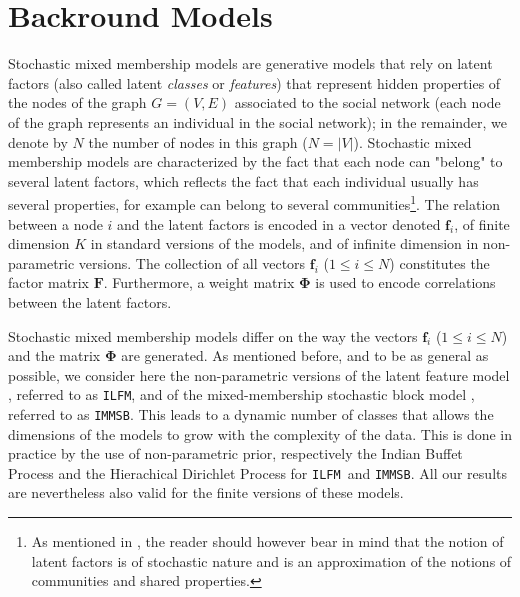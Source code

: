 \documentclass[journal]{IEEEtran}
\newcommand{\ifm}{\texttt{ILFM}}
\newcommand{\imb}{\texttt{IMMSB}}
\newcommand{\mat}[1]{\mathbf{#1}}
\begin{document}
\section{Backround Models}
\label{sec:background}

Stochastic mixed membership models are generative models that rely on latent factors (also called latent \textit{classes} or \textit{features}) that represent hidden properties of the nodes of the graph $G=(V,E)$ associated to the social network (each node of the graph represents an individual in the social network); in the remainder, we denote by $N$ the number of nodes in this graph ($N=|V|$). Stochastic mixed membership models are characterized by the fact that each node can "belong" to several latent factors, which reflects the fact that each individual usually has several properties, for example can belong to several communities\footnote{As mentioned in \cite{goldenberg2010survey}, the reader should however bear in mind that the notion of latent factors is of stochastic nature and is an approximation of the notions of communities and shared properties.}. The relation between a node $i$ and the latent factors is encoded in a vector denoted $\mat{f}_{i}$, of finite dimension $K$ in standard versions of the models, and of infinite dimension in  non-parametric versions. The collection of all vectors $\mat{f}_{i}$ ($1 \le i \le N$) constitutes the factor matrix $\mat{F}$. Furthermore, a weight matrix $\mat{\Phi}$ is used to encode correlations between the latent factors.

Stochastic mixed membership models differ on the way the vectors $\mat{f}_{i}$ ($1 \le i \le N$) and the matrix $\mat{\Phi}$ are generated. As mentioned before, and to be as general as possible, we consider here the non-parametric versions of the latent feature model \cite{ILFRM}, referred to as \ifm, and of the mixed-membership stochastic block model \cite{iMMSB,diMMSB}, referred to as \imb. This leads to a dynamic number of classes that allows the dimensions of the models to grow with the complexity of the data. This is done in practice by the use of non-parametric prior, respectively the Indian Buffet Process and the Hierachical Dirichlet Process for \ifm\ and \imb. All our results are nevertheless also valid for the finite versions of these models.
\end{document}
